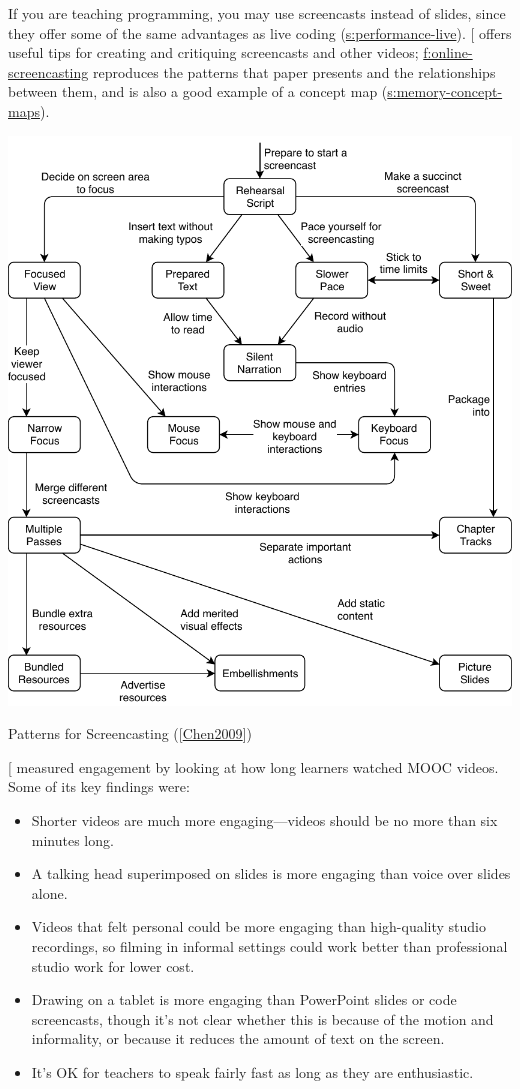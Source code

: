 If you are teaching programming, you may use screencasts instead of
slides, since they offer some of the same advantages as live coding
(\protect\hyperlink{SECTION}{s:performance-live}). {[}\protect[\hyperlink{b:Chen2009}{Chen2009}]{]} offers useful tips
for creating and critiquing screencasts and other videos;
\protect\hyperlink{FIGURE}{f:online-screencasting} reproduces the patterns that paper
presents and the relationships between them, and is also a good example
of a concept map (\protect\hyperlink{SECTION}{s:memory-concept-maps}).

\includegraphics{../../files/screencast.pdf}

Patterns for Screencasting ({[}\protect\hyperlink{Chen2009}{Chen2009}{]})

{[}\protect[\hyperlink{b:Guo2014}{Guo2014}]{]} measured engagement by looking at how long learners
watched MOOC videos. Some of its key findings were:

\begin{itemize}
\item
  Shorter videos are much more engaging---videos should be no more than
  six minutes long.
\item
  A talking head superimposed on slides is more engaging than voice
  over slides alone.
\item
  Videos that felt personal could be more engaging than high-quality
  studio recordings, so filming in informal settings could work better
  than professional studio work for lower cost.
\item
  Drawing on a tablet is more engaging than PowerPoint slides or code
  screencasts, though it's not clear whether this is because of the
  motion and informality, or because it reduces the amount of text on
  the screen.
\item
  It's OK for teachers to speak fairly fast as long as they are
  enthusiastic.
\end{itemize}

